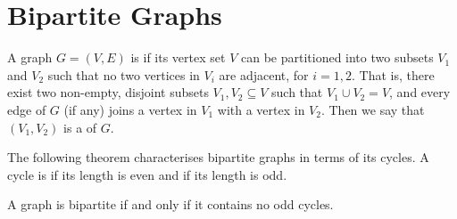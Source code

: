 \section{Bipartite Graphs}\label{sec:Bipartite}

A graph $G = (V, E)$ is  if its vertex set $V$ can be partitioned into two subsets $V_1$ and $V_2$ such that no two vertices in $V_i$ are adjacent, for $i = 1, 2$. That is, there exist two non-empty, disjoint subsets $V_1, V_2 \subseteq V$ such that $V_1 \cup V_2 = V$, and every edge of $G$ (if any) joins a vertex in $V_1$ with a vertex in $V_2$. Then we say that $(V_1, V_2)$ is a  of $G$.

The following theorem characterises bipartite graphs in terms of its cycles. A cycle is  if its length is even and  if its length is odd.

\begin{Theorem}
A graph is bipartite if and only if it contains no odd cycles.
\end{Theorem}

